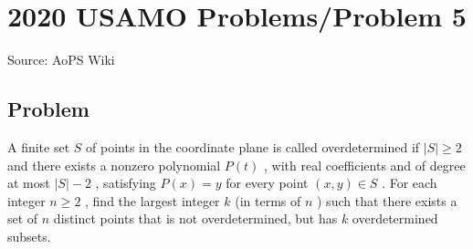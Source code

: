 \documentclass[12pt]{article}
\begin{document}
\section*{{2020 USAMO Problems/Problem 5}}
Source: AoPS Wiki

\subsection*{Problem}
A finite set $S$ of points in the coordinate plane is called overdetermined if $|S| \ge 2$ and there exists a nonzero polynomial $P(t)$ , with real coefficients and of degree at most $|S| - 2$ , satisfying $P(x) = y$ for every point $(x, y) \in S$ . For each integer $n \ge 2$ , find the largest integer $k$ (in terms of $n$ ) such that there exists a set of $n$ distinct points that is not overdetermined, but has $k$ overdetermined subsets.
\end{document}
